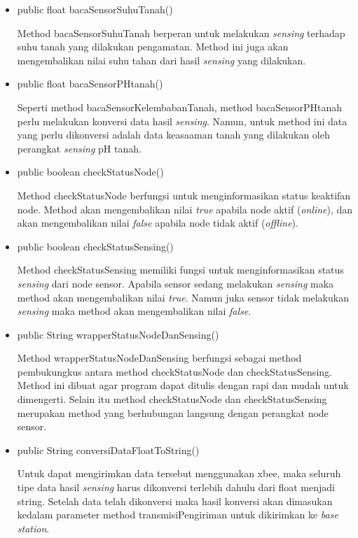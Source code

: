 \begin{itemize}
        \item public float bacaSensorSuhuTanah()
        
        Method bacaSensorSuhuTanah berperan untuk melakukan \textit{sensing} terhadap suhu tanah yang dilakukan pengamatan. Method ini juga akan mengembalikan nilai suhu tahan dari hasil \textit{sensing} yang dilakukan.
        
        \item public float bacaSensorPHtanah()
        
        Seperti method bacaSensorKelembabanTanah, method bacaSensorPHtanah perlu melakukan konversi data hasil \textit{sensing}. Namun, untuk method ini data yang perlu dikonversi adalah data keasaaman tanah yang dilakukan oleh perangkat \textit{sensing} pH tanah.
        
        \item public boolean checkStatusNode()
        
        Method checkStatusNode berfungsi untuk menginformasikan status keaktifan node. Method akan mengembalikan nilai \textit{true} apabila node aktif (\textit{online}), dan akan mengembalikan nilai \textit{false} apabila node tidak aktif (\textit{offline}).
        
        \item public boolean checkStatusSensing()
        
        Method checkStatusSensing memiliki fungsi untuk menginformasikan status \textit{sensing} dari node sensor. Apabila sensor sedang melakukan \textit{sensing} maka method akan mengembalikan nilai \textit{true}. Namun juka sensor tidak melakukan \textit{sensing} maka method akan mengembalikan nilai \textit{false}.
        
        \item public String wrapperStatusNodeDanSensing()
        
        Method wrapperStatusNodeDanSensing berfungsi sebagai method pembukungkus antara method checkStatusNode dan checkStatusSensing. Method ini dibuat agar program dapat ditulis dengan rapi dan mudah untuk dimengerti. Selain itu method checkStatusNode dan checkStatusSensing merupakan method yang berhubungan langsung dengan perangkat node sensor.
        
        \item public String conversiDataFloatToString()
        
        Untuk dapat mengirimkan data tersebut menggunakan xbee, maka seluruh tipe data hasil \textit{sensing} harus dikonversi terlebih dahulu dari float menjadi string. Setelah data telah dikonversi maka hasil konversi akan dimasukan kedalam parameter method transmisiPengiriman untuk dikirimkan ke \textit{base station}.
        

\end{itemize}
